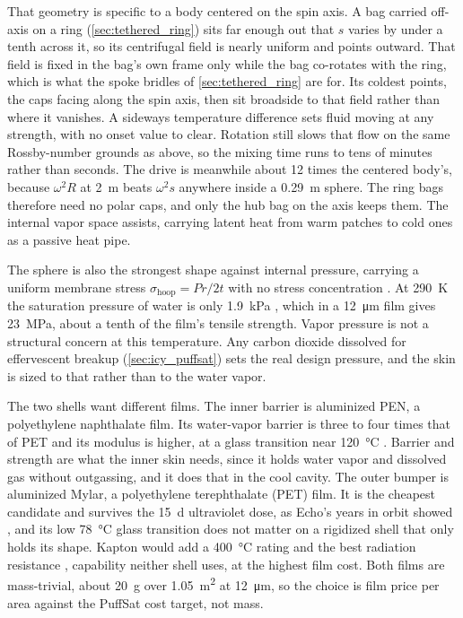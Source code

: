 \documentclass{article}
\begin{document}
That geometry is specific to a body centered on the spin axis. A bag carried off-axis on a ring (\autoref{sec:tethered_ring}) sits far enough out that \(s\) varies by under a tenth across it, so its centrifugal field is nearly uniform and points outward. That field is fixed in the bag's own frame only while the bag co-rotates with the ring, which is what the spoke bridles of \autoref{sec:tethered_ring} are for. Its coldest points, the caps facing along the spin axis, then sit broadside to that field rather than where it vanishes. A sideways temperature difference sets fluid moving at any strength, with no onset value to clear. Rotation still slows that flow on the same Rossby-number grounds as above, so the mixing time runs to tens of minutes rather than seconds. The drive is meanwhile about 12 times the centered body's, because \(\omega^2 R\) at \SI{2}{\meter} beats \(\omega^2 s\) anywhere inside a \SI{0.29}{\meter} sphere. The ring bags therefore need no polar caps, and only the hub bag on the axis keeps them. The internal vapor space assists, carrying latent heat from warm patches to cold ones as a passive heat pipe.

The sphere is also the strongest shape against internal pressure, carrying a uniform membrane stress \(\sigma_\mathrm{hoop}=Pr/2t\) with no stress concentration \cite{young2011roark}. At \SI{290}{\kelvin} the saturation pressure of water is only \SI{1.9}{\kilo\pascal} \cite{nist_webbook_water}, which in a \SI{12}{\micro\meter} film gives \SI{23}{\mega\pascal}, about a tenth of the film's tensile strength. Vapor pressure is not a structural concern at this temperature. Any carbon dioxide dissolved for effervescent breakup (\autoref{sec:icy_puffsat}) sets the real design pressure, and the skin is sized to that rather than to the water vapor.

The two shells want different films. The inner barrier is aluminized PEN, a polyethylene naphthalate film. Its water-vapor barrier is three to four times that of PET and its modulus is higher, at a glass transition near \SI{120}{\celsius} \cite{macdonald2004engineered}. Barrier and strength are what the inner skin needs, since it holds water vapor and dissolved gas without outgassing, and it does that in the cool cavity. The outer bumper is aluminized Mylar, a polyethylene terephthalate (PET) film. It is the cheapest candidate and survives the \SI{15}{\day} ultraviolet dose, as Echo's years in orbit showed \cite{nasa_echo_ii_1966}, and its low \SI{78}{\celsius} glass transition does not matter on a rigidized shell that only holds its shape. Kapton would add a \SI{400}{\celsius} rating and the best radiation resistance \cite{sroog1991polyimides}, capability neither shell uses, at the highest film cost. Both films are mass-trivial, about \SI{20}{\gram} over \SI{1.05}{\square\meter} at \SI{12}{\micro\meter}, so the choice is film price per area against the PuffSat cost target, not mass.
\end{document}
